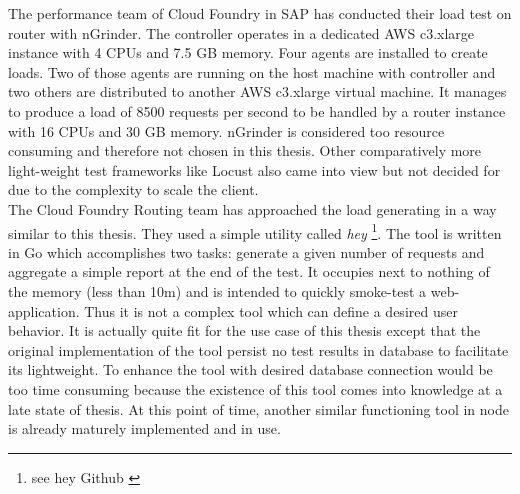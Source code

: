 The performance team of Cloud Foundry in SAP has conducted their load test on router with nGrinder. The controller operates in a dedicated AWS c3.xlarge instance with 4 CPUs and 7.5 GB memory. Four agents are installed to create loads. Two of those agents are running on the host machine with controller and two others are distributed to another AWS c3.xlarge virtual machine. It manages to produce a load of 8500 requests per second to be handled by a router instance with 16 CPUs and 30 GB memory. nGrinder is considered too resource consuming and therefore not chosen in this thesis. Other comparatively more light-weight test frameworks like Locust also came into view but not decided for due to the complexity to scale the client.\\
The Cloud Foundry Routing team has approached the load generating in a way similar to this thesis. They used a simple utility called \textit{hey} \footnote{see hey Github \citep{Hey}}. The tool is written in Go which accomplishes two tasks: generate a given number of requests and aggregate a simple report at the end of the test. It occupies next to nothing of the memory (less than 10m) and is intended to quickly smoke-test a web-application. Thus it is not a complex tool which can define a desired user behavior. It is actually quite fit for the use case of this thesis except that the original implementation of the tool persist no test results in database to facilitate its lightweight. To enhance the tool with desired database connection would be too time consuming because the existence of this tool comes into knowledge at a late state of thesis. At this point of time, another similar functioning tool in node is already maturely implemented and in use.\\    




  
